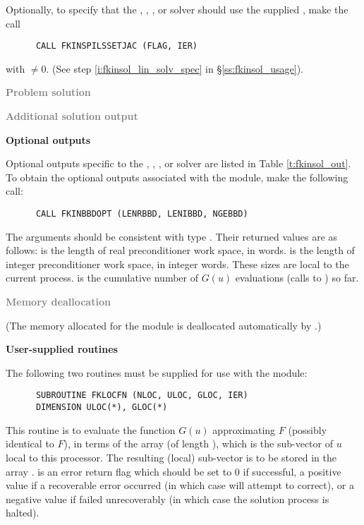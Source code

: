 \begin{Steps}
  Optionally, to specify that the {\spgmr}, {\spfgmr}, {\spbcg}, or {\sptfqmr} solver should use
  the supplied , make the call
\begin{verbatim}
      CALL FKINSPILSSETJAC (FLAG, IER)
\end{verbatim}
  with  $\neq 0$.
  (See step \ref{i:fkinsol_lin_solv_spec} in \S\ref{ss:fkinsol_usage}).

\item \textcolor{gray}{\bf Problem solution}

\item \textcolor{gray}{\bf Additional solution output}

\item {\bf {\kinbbdpre} Optional outputs}

  Optional outputs specific to the {\spgmr}, {\spfgmr}, {\spbcg}, or {\sptfqmr} solver are
  listed in Table \ref{t:fkinsol_out}.
  To obtain the optional outputs associated with the {\kinbbdpre} module, make
  the following call:
\begin{verbatim}
      CALL FKINBBDOPT (LENRBBD, LENIBBD, NGEBBD)
\end{verbatim}
  The arguments should be consistent with {\CC} type .  Their
  returned values are as follows:
   is the length of real preconditioner work space, in 
  words.  is the length of integer preconditioner work space, in
  integer words. These sizes are local to the current process.
   is the cumulative number of $G(u)$ evaluations (calls to )
  so far.
  
\item \textcolor{gray}{\bf Memory deallocation}

  (The memory allocated for the {\fkinbbd} module is deallocated automatically
  by .)

\item {\bf User-supplied routines}

  The following two routines must be supplied for use with the {\kinbbdpre}
  module:
\begin{verbatim}
      SUBROUTINE FKLOCFN (NLOC, ULOC, GLOC, IER)
      DIMENSION ULOC(*), GLOC(*)
\end{verbatim}
  This routine is to evaluate the function $G(u)$ approximating $F$
  (possibly identical to $F$), in terms of the array
   (of length ), which is the sub-vector
  of $u$ local to this processor.  The resulting (local) sub-vector
  is to be stored in the array .
   is an error return flag which should be set to $0$ if successful,
  a positive value if a recoverable error occurred (in which case {\kinsol} will
  attempt to correct), or a negative value if  failed unrecoverably
  (in which case the solution process is halted).


\end{Steps}

